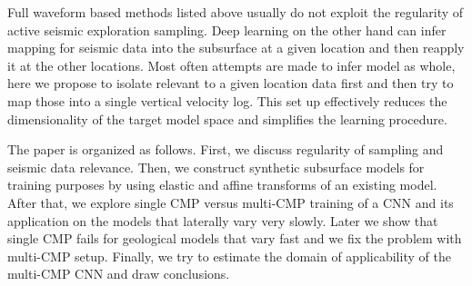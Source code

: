 \documentclass[paper,twocolomn]{geophysics}
\begin{document}
Full waveform based methods listed above usually do not exploit the regularity of active seismic exploration sampling. Deep learning on the other hand can infer mapping for seismic data into the subsurface at a given location and then reapply it at the other locations. Most often attempts are made to infer model as whole, here we propose to isolate relevant to a given location data first and then try to map those into a single vertical velocity log. This set up effectively reduces the dimensionality of the target model space and simplifies the learning procedure.

The paper is organized as follows. First, we discuss regularity of sampling and seismic data relevance.
%
Then, we construct synthetic subsurface models for training purposes by using elastic and affine transforms of an existing model.
%
After that, we explore single CMP versus multi-CMP training of a CNN and its application on the models that laterally vary very slowly.
%
Later we show that single CMP fails for geological models that vary fast and we fix the problem with multi-CMP setup.
%
Finally, we try to estimate the domain of applicability of the multi-CMP CNN and draw conclusions.
\end{document}
